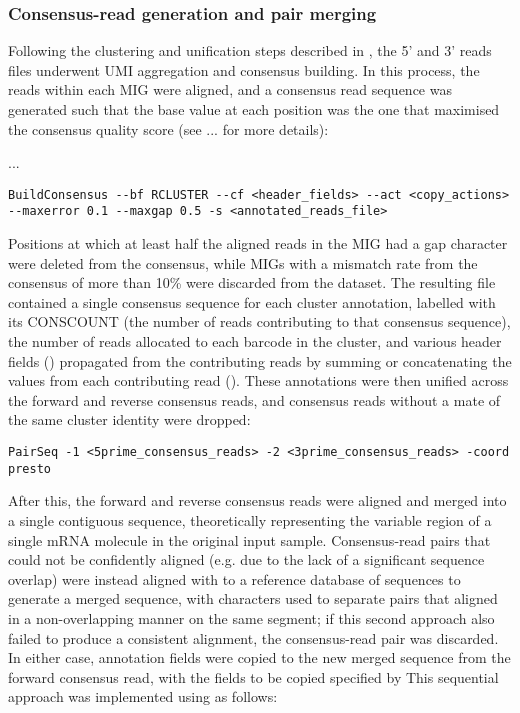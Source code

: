\subsubsection{Consensus-read generation and pair merging}
\label{sec:methods-comp-presto-merge}

Following the clustering and unification steps described in , the 5' and 3' reads files underwent UMI aggregation and consensus building. In this process, the reads within each MIG were aligned, and a consensus read sequence was generated such that the base value at each position was the one that maximised the consensus quality score (see ... for more details): %

 ... %

\begin{lstlisting}
BuildConsensus --bf RCLUSTER --cf <header_fields> --act <copy_actions> --maxerror 0.1 --maxgap 0.5 -s <annotated_reads_file>
\end{lstlisting}

Positions at which at least half the aligned reads in the MIG had a gap character were deleted from the consensus, while MIGs with a mismatch rate from the consensus of more than 10\% were discarded from the dataset. The resulting  file contained a single consensus sequence for each cluster annotation, labelled with its CONSCOUNT (the number of reads contributing to that consensus sequence),  the number of reads allocated to each barcode in the cluster, and various header fields () propagated from the contributing reads by summing or concatenating the values from each contributing read (). These annotations were then unified across the forward and reverse consensus reads, and consensus reads without a mate of the same cluster identity were dropped: %

\begin{lstlisting}
PairSeq -1 <5prime_consensus_reads> -2 <3prime_consensus_reads> -coord presto
\end{lstlisting}

After this, the forward and reverse consensus reads were aligned and merged into a single contiguous sequence, theoretically representing the variable region of a single mRNA molecule in the original input sample. Consensus-read pairs that could not be confidently aligned (e.g. due to the lack of a significant sequence overlap) were instead aligned with  to a reference database of \vh sequences to generate a merged sequence, with  characters used to separate pairs that aligned in a non-overlapping manner on the same \vh segment; if this second approach also failed to produce a consistent alignment, the consensus-read pair was discarded. In either case, annotation fields were copied to the new merged sequence from the forward consensus read, with the fields to be copied specified by  This sequential approach was implemented using  as follows:

